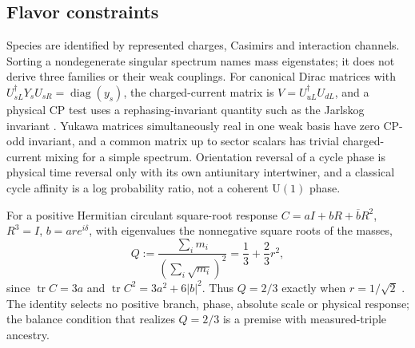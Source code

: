 \documentclass[11pt]{article}
\newcommand{\U}{\mathrm{U}}
\begin{document}
\subsection{Flavor constraints}

Species are identified by represented charges, Casimirs and interaction
channels. Sorting a nondegenerate singular spectrum names mass eigenstates;
it does not derive three families or their weak couplings. For canonical
Dirac matrices with \(U_{sL}^\dagger Y_sU_{sR}=\operatorname{diag}(y_s)\),
the charged-current matrix is \(V=U_{uL}^\dagger U_{dL}\), and a physical CP
test uses a rephasing-invariant quantity such as the Jarlskog invariant
\cite{pwjarlskog1985commutator,pdg2024ckm}. Yukawa matrices simultaneously
real in one weak basis have zero CP-odd invariant, and a common matrix up to
sector scalars has trivial charged-current mixing for a simple spectrum.
Orientation reversal of a cycle phase is physical time reversal only with
its own antiunitary intertwiner, and a classical cycle affinity is a log
probability ratio, not a coherent \(\U(1)\) phase.

For a positive Hermitian circulant square-root response
\(C=aI+bR+\overline bR^2\), \(R^3=I\), \(b=are^{i\delta}\), with eigenvalues
the nonnegative square roots of the masses,
\[
 Q:=\frac{\sum_im_i}{(\sum_i\sqrt{m_i})^2}=\frac13+\frac23r^2,
\]
since \(\operatorname{tr}C=3a\) and \(\operatorname{tr}C^2=3a^2+6|b|^2\).
Thus \(Q=2/3\) exactly when \(r=1/\sqrt2\) \cite{koide1983,brannen2006}. The
identity selects no positive branch, phase, absolute scale or physical
response; the balance condition that realizes \(Q=2/3\) is a premise with
measured-triple ancestry.
\end{document}
